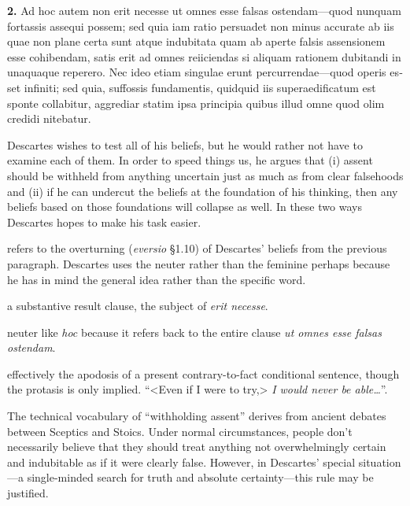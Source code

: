 
\clearpage

\beginnumbering
\pstart
\begin{latin}
    \textenglish{\textbf{2.}} Ad hoc autem non erit necesse ut omnes esse falsas ostendam---quod nunquam fortassis assequi possem; sed quia iam ratio persuadet non minus accurate ab iis quae non plane certa sunt atque indubitata quam ab aperte falsis assensionem esse cohibendam, satis erit ad omnes reiiciendas si aliquam rationem dubitandi in unaquaque reperero. Nec ideo etiam singulae erunt percurrendae---quod operis esset infiniti; sed quia, suffossis fundamentis, quidquid iis superaedificatum est sponte collabitur, aggrediar statim ipsa principia quibus illud omne quod olim credidi nitebatur.
\end{latin}
\pend
\endnumbering

\prenotes

Descartes wishes to test all of his beliefs, but he would rather not have to examine each of them. In order to speed things us, he argues that (i) assent should be withheld from anything uncertain just as much as from clear falsehoods and (ii) if he can undercut the beliefs at the foundation of his thinking, then any beliefs based on those foundations will collapse as well. In these two ways Descartes hopes to make his task easier.

 refers to the overturning (\textit{eversio} §1.10) of Descartes' beliefs from the previous paragraph. Descartes uses the neuter rather than the feminine perhaps because he has in mind the general idea rather than the specific word.

 a substantive result clause, the subject of \textit{erit necesse}.

 neuter like \textit{hoc} because it refers back to the entire clause \textit{ut omnes esse falsas ostendam}.

 effectively the apodosis of a present contrary-to-fact conditional sentence, though the protasis is only implied. ``<Even if I were to try,> \textit{I would never be able\dots}''.

 The technical vocabulary of ``withholding assent'' derives from ancient debates between Sceptics and Stoics. Under normal circumstances, people don't necessarily believe that they should treat anything not overwhelmingly certain and indubitable as if it were clearly false. However, in Descartes' special situation---a single-minded search for truth and absolute certainty---this rule may be justified.

